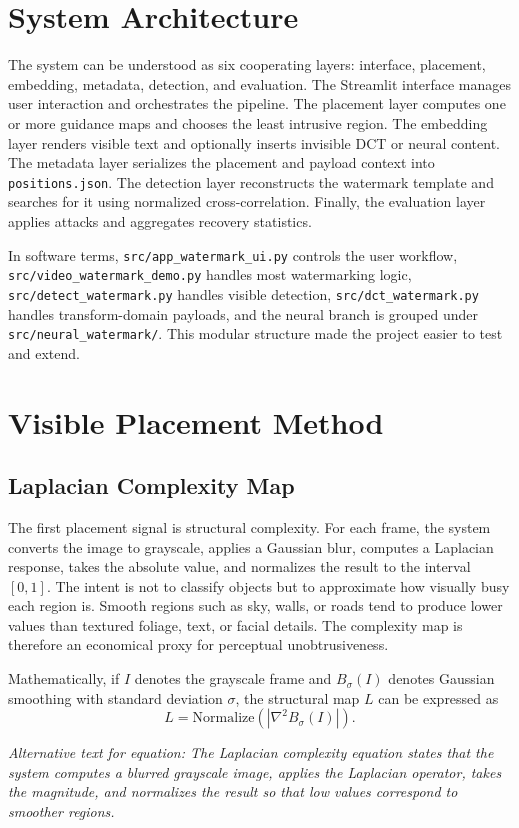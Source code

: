 \documentclass[12pt,oneside]{report}
\newcommand{\FormulaAlt}[1]{\par\small\textit{Alternative text for equation: #1}\normalsize}
\begin{document}
\section{System Architecture}
The system can be understood as six cooperating layers: interface, placement, embedding, metadata, detection, and evaluation. The Streamlit interface manages user interaction and orchestrates the pipeline. The placement layer computes one or more guidance maps and chooses the least intrusive region. The embedding layer renders visible text and optionally inserts invisible DCT or neural content. The metadata layer serializes the placement and payload context into \texttt{positions.json}. The detection layer reconstructs the watermark template and searches for it using normalized cross-correlation. Finally, the evaluation layer applies attacks and aggregates recovery statistics.

In software terms, \texttt{src/app\_watermark\_ui.py} controls the user workflow, \texttt{src/video\_watermark\_demo.py} handles most watermarking logic, \texttt{src/detect\_watermark.py} handles visible detection, \texttt{src/dct\_watermark.py} handles transform-domain payloads, and the neural branch is grouped under \texttt{src/neural\_watermark/}. This modular structure made the project easier to test and extend.

\section{Visible Placement Method}
\subsection{Laplacian Complexity Map}
The first placement signal is structural complexity. For each frame, the system converts the image to grayscale, applies a Gaussian blur, computes a Laplacian response, takes the absolute value, and normalizes the result to the interval $[0,1]$. The intent is not to classify objects but to approximate how visually busy each region is. Smooth regions such as sky, walls, or roads tend to produce lower values than textured foliage, text, or facial details. The complexity map is therefore an economical proxy for perceptual unobtrusiveness.

Mathematically, if $I$ denotes the grayscale frame and $B_{\sigma}(I)$ denotes Gaussian smoothing with standard deviation $\sigma$, the structural map $L$ can be expressed as
\begin{equation}
L = \mathrm{Normalize}\left(\left|\nabla^2 B_{\sigma}(I)\right|\right).
\end{equation}
\FormulaAlt{The Laplacian complexity equation states that the system computes a blurred grayscale image, applies the Laplacian operator, takes the magnitude, and normalizes the result so that low values correspond to smoother regions.}
\end{document}
